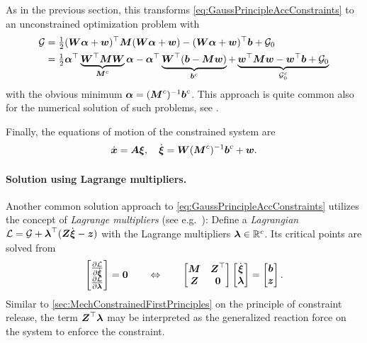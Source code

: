 As in the previous section, this transforms \eqref{eq:GaussPrincipleAccConstraints} to an unconstrained optimization problem with
\begin{align}
 \GaussianConstraint &= \tfrac{1}{2} (\mat{W}\tuple{\alpha} + \tuple{w})^\top \sysInertiaMat (\mat{W}\tuple{\alpha} + \tuple{w}) - (\mat{W}\tuple{\alpha} + \tuple{w})^\top \sysForce + \GaussianConstraint_0
\\
 &= \tfrac{1}{2} \tuple{\alpha}^\top \underbrace{\mat{W}^\top \sysInertiaMat \mat{W}}_{\sysInertiaMat^c} \tuple{\alpha} - \tuple{\alpha}^\top \underbrace{\mat{W}^\top (\sysForce - \sysInertiaMat \tuple{w})}_{\sysForce^c} + \underbrace{\tuple{w}^\top \sysInertiaMat \tuple{w} - \tuple{w}^\top \sysForce + \GaussianConstraint_0}_{\GaussianConstraint_0^c}
\end{align}
with the obvious minimum $\tuple{\alpha} = (\sysInertiaMat^c)^{-1} \sysForce^c$.
This approach is quite common also for the numerical solution of such problems, see \cite{Gould:EqualityConstrainedQuadraticProgramming}.

Finally, the equations of motion of the constrained system are
\begin{align}
 \sysCoordd = \kinMat\sysVel, 
\quad
 \sysVeld = \mat{W}(\sysInertiaMat^c)^{-1} \sysForce^c + \tuple{w}.
\end{align}

\paragraph{Solution using Lagrange multipliers.}
Another common solution approach to \eqref{eq:GaussPrincipleAccConstraints} utilizes the concept of \textit{Lagrange multipliers} (see e.g.\ \cite[ch.\,14]{Luenberger:LinearAndNonlinearProgramming}):
Define a \textit{Lagrangian} $\Lagrangian = \GaussianConstraint + \LagrangeMult^\top (\accConstraintMat\sysVeld - \accConstraintB)$ with the Lagrange multipliers $\LagrangeMult \in \RealNum^c$.
Its critical points are solved from
\begin{align}\label{eq:EOMMultipliers}
 \begin{bmatrix} \pdiff[\Lagrangian]{\sysVeld} \\ \pdiff[\Lagrangian]{\LagrangeMult} \end{bmatrix} = \tuple{0}
\qquad\Leftrightarrow\qquad
 \begin{bmatrix} \sysInertiaMat & \accConstraintMat^\top \\ \accConstraintMat & \mat{0} \end{bmatrix}
 \begin{bmatrix} \sysVeld \\ \LagrangeMult \end{bmatrix}
 =
 \begin{bmatrix} \sysForce \\ \accConstraintB \end{bmatrix}.
\end{align}
Similar to \autoref{sec:MechConstrainedFirstPrinciples} on the principle of constraint release, the term $\accConstraintMat^\top \LagrangeMult$ may be interpreted as the generalized reaction force on the system to enforce the constraint.
 
